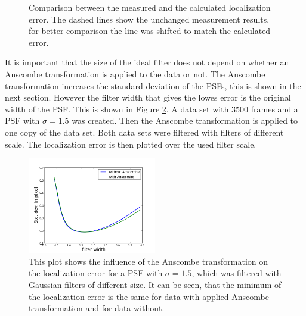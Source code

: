 \begin{figure}
\hfill
{}
	\caption{Comparison between the measured and the calculated localization error. The dashed lines show the unchanged measurement results, for better comparison the line was shifted to match the calculated error.}
	\label{matchedFilter2}	
\end{figure}
It is important that the size of the ideal filter does not depend on whether an Anscombe transformation is applied to the data or not. The Anscombe transformation increases the standard deviation of the PSFs, this is shown in the next section. However the filter width that gives the lowes error is the original width of the PSF. This is shown in Figure \ref{PSFdoesnotcare}. A data set with 3500 frames and a PSF with $\sigma=1.5$ was created. Then the Anscombe transformation is applied to one copy of the data set. Both data sets were filtered with filters of different scale. The localization error is then plotted over the used filter scale.

\begin{figure}
\includegraphics[width = 0.5\textwidth]{pictures/AnscVsNoAnsc.png}
\caption{This plot shows the influence of the Anscombe transformation on the localization error for a PSF with $\sigma=1.5$, which was filtered with Gaussian filters of different size. It can be seen, that the minimum of the localization error is the same for data with applied Anscombe transformation and for data without.}
\label{PSFdoesnotcare}
\end{figure}

